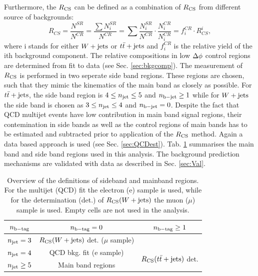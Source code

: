 Furthermore, the $R_{\rm CS}$ can be defined as a combination of $R_{\rm CS}$ from different source of backgrounds:
\begin{equation}
\label{eq:rcs_frac}
R_{CS} = \frac{N^{SR}}{N^{CR}} = \frac{\sum N^{SR}_i}{N^{CR}} = \sum \frac{ N^{SR}_i}{N^{CR}} \cdot \frac{ N^{CR}_i}{N^{CR}_i} = f^{CR}_i \cdot R_{CS}^i,
\end{equation}
where i stands for either $W+\textrm{jets}$ or $t\bar{t}+\textrm{jets}$ and $f^{CR}_i$ is the relative yield of the ith background component. 
The relative compositions in low $\Delta \phi$ control regions are determined from fit to data (see Sec. \ref{sec:bkgcomp}). The measurement of $R_{\rm CS}$ is performed in two seperate side band regions. These regions are chosen, such that they mimic the kinematics of the main band as closely as possible.
For $t\bar{t}+\textrm{jets}$, the side band region is $4\leq n_{\rm jet}\leq5$ and $n_{\rm b-jet}\geq1$ while for $W+\textrm{jets}$ the side band is chosen as $3\leq n_{\rm jet}\leq4$ and $n_{\rm b-jet}=0$.
Despite the fact that QCD multijet events have low contribution in main band signal regions, their contemination in side bands as well as the control regions of main bands has to be estimated and subtracted prior to application of the $R_{\rm CS}$ method. Again a data based approach is used (see Sec. \ref{sec:QCDest}).
Tab. \ref{tab:SBMBRegions} summarises the main band and side band regions used in this analysis.
The background prediction mechanisms are validated with data as described in Sec. \ref{sec:Val}.
\begin{table}[!htb]
\caption{Overview of the definitions of sideband and mainband regions.
For the multijet (QCD) fit the electron (e) sample is used, while for the determination (det.)
of $R_{\rm CS}(W+\textrm{jets})$ the muon ($\mu$) sample is used. Empty cells are not used in the analysis.
}
\label{tab:SBMBRegions}
\centering
\begin{tabular}{c|c|c}
$n_{\rm b-tag}$       & $n_{\rm b-tag} = 0$                                    &  $n_{\rm b-tag}\geq1$\\ \hline
$n_{\rm jet}=3$      &  $R_{\rm CS}(W+\textrm{jets})$ det. ($\mu$ sample)& \\ \cline{1-1}  \cline{3-3}
$n_{\rm jet}=4$      &  QCD bkg. fit (e sample)  & \multirow{2}{*}{$R_{\rm CS}(t\bar{t}+\textrm{jets})$ det.} \\\cline{1-2}
$n_{\rm jet}\geq5$ & Main band regions &  \\ \hline
\end{tabular}
\end{table}
